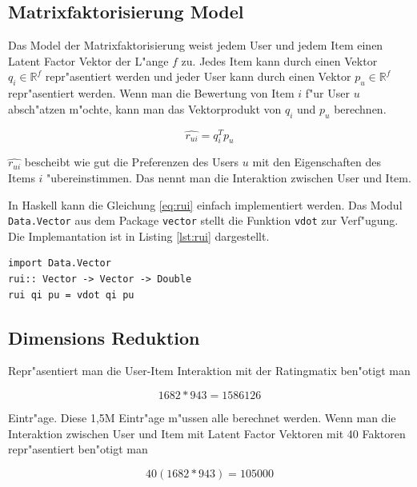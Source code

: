 \documentclass[a4paper, 12pt]{article}
\begin{document}
\subsection{Matrixfaktorisierung Model}
\label{sec:matrixfactorizationmodel}

Das Model der Matrixfaktorisierung weist jedem User und jedem Item einen Latent Factor Vektor der L"ange $f$ zu. Jedes Item kann durch einen Vektor $q_i \in \mathbb{R}^f$ repr"asentiert werden und jeder User kann durch einen Vektor $p_u \in \mathbb{R}^f$ repr"asentiert werden. Wenn man die Bewertung von Item $i$ f"ur User $u$ absch"atzen m"ochte, kann man das Vektorprodukt von $q_i$ und $p_u$ berechnen.

\begin{equation}
  \label{eq:rui}
  \hat{r_{ui}} = q_i^T p_u
\end{equation}

$\hat{r_{ui}}$ bescheibt wie gut die Preferenzen des Users $u$ mit den Eigenschaften des Items $i$ "ubereinstimmen. Das nennt man die Interaktion zwischen User und Item.

In Haskell kann die Gleichung \ref{eq:rui} einfach implementiert werden. Das Modul \verb|Data.Vector| aus dem Package \verb|vector| stellt die Funktion \verb|vdot| zur Verf"ugung. Die Implemantation ist in Listing \ref{lst:rui} dargestellt.

\begin{lstlisting}[caption=Implementation der Vorhersage, label=lst:rui]
import Data.Vector
rui:: Vector -> Vector -> Double
rui qi pu = vdot qi pu
\end{lstlisting}

\subsection{Dimensions Reduktion}
\label{sec:dimred}

Repr"asentiert man die User-Item Interaktion mit der Ratingmatix ben"otigt man 

\begin{equation}
  \label{eq:dimre}
  1682 * 943 = 1586126
\end{equation}

Eintr"age. Diese 1,5M Eintr"age m"ussen alle berechnet werden. Wenn man die Interaktion zwischen User und Item mit Latent Factor Vektoren mit 40 Faktoren repr"asentiert ben"otigt man 

\begin{equation}
  \label{eq:dimred}
  40(1682*943) = 105000
\end{equation}
\end{document}
